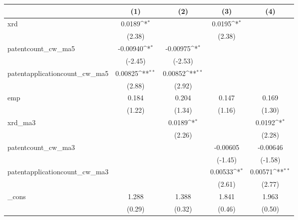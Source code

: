 {
\def\sym#1{\ifmmode^{#1}\else\(^{#1}\)\fi}
\begin{tabular}{l*{4}{c}}
\hline\hline
            &\multicolumn{1}{c}{(1)}         &\multicolumn{1}{c}{(2)}         &\multicolumn{1}{c}{(3)}         &\multicolumn{1}{c}{(4)}         \\
\hline
xrd         &      0.0189\sym{*}  &                     &      0.0195\sym{*}  &                     \\
            &      (2.38)         &                     &      (2.38)         &                     \\
[1em]
patentcount\_cw\_ma5&    -0.00940\sym{*}  &    -0.00975\sym{*}  &                     &                     \\
            &     (-2.45)         &     (-2.53)         &                     &                     \\
[1em]
patentapplicationcount\_cw\_ma5&     0.00825\sym{**} &     0.00852\sym{**} &                     &                     \\
            &      (2.88)         &      (2.92)         &                     &                     \\
[1em]
emp         &       0.184         &       0.204         &       0.147         &       0.169         \\
            &      (1.22)         &      (1.34)         &      (1.16)         &      (1.30)         \\
[1em]
xrd\_ma3     &                     &      0.0189\sym{*}  &                     &      0.0192\sym{*}  \\
            &                     &      (2.26)         &                     &      (2.28)         \\
[1em]
patentcount\_cw\_ma3&                     &                     &    -0.00605         &    -0.00646         \\
            &                     &                     &     (-1.45)         &     (-1.58)         \\
[1em]
patentapplicationcount\_cw\_ma3&                     &                     &     0.00533\sym{*}  &     0.00571\sym{**} \\
            &                     &                     &      (2.61)         &      (2.77)         \\
[1em]
\_cons      &       1.288         &       1.388         &       1.841         &       1.963         \\
            &      (0.29)         &      (0.32)         &      (0.46)         &      (0.50)         \\

\end{tabular}}
